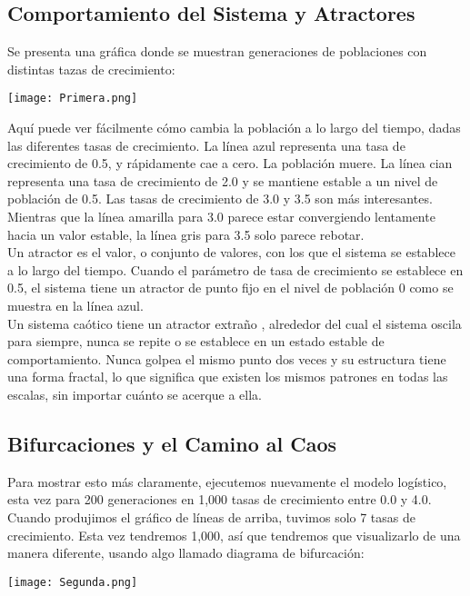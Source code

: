 \documentclass[12pt]{article}
\begin{document}
\subsection*{Comportamiento del Sistema y Atractores}

Se presenta una gráfica donde se muestran generaciones de poblaciones con distintas tazas de crecimiento:

\begin{center}
    \texttt{[image: Primera.png]}
\end{center}

Aquí puede ver fácilmente cómo cambia la población a lo largo del tiempo, dadas las diferentes tasas de crecimiento. La línea azul representa una tasa de crecimiento de 0.5, y rápidamente cae a cero. La población muere. La línea cian representa una tasa de crecimiento de 2.0 y se mantiene estable a un nivel de población de 0.5. Las tasas de crecimiento de 3.0 y 3.5 son más interesantes. Mientras que la línea amarilla para 3.0 parece estar convergiendo lentamente hacia un valor estable, la línea gris para 3.5 solo parece rebotar.\\

Un atractor es el valor, o conjunto de valores, con los que el sistema se establece a lo largo del tiempo. Cuando el parámetro de tasa de crecimiento se establece en 0.5, el sistema tiene un atractor de punto fijo en el nivel de población 0 como se muestra en la línea azul.\\

Un sistema caótico tiene un atractor extraño , alrededor del cual el sistema oscila para siempre, nunca se repite o se establece en un estado estable de comportamiento. Nunca golpea el mismo punto dos veces y su estructura tiene una forma fractal, lo que significa que existen los mismos patrones en todas las escalas, sin importar cuánto se acerque a ella.

\subsection*{Bifurcaciones y el Camino al Caos}

Para mostrar esto más claramente, ejecutemos nuevamente el modelo logístico, esta vez para 200 generaciones en 1,000 tasas de crecimiento entre 0.0 y 4.0. Cuando produjimos el gráfico de líneas de arriba, tuvimos solo 7 tasas de crecimiento. Esta vez tendremos 1,000, así que tendremos que visualizarlo de una manera diferente, usando algo llamado diagrama de bifurcación:
\begin{center}
    \texttt{[image: Segunda.png]}
\end{center}
\end{document}
